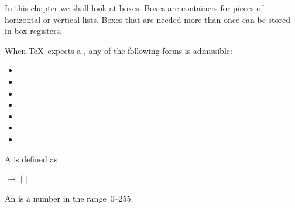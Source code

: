 \documentclass{book}
\begin{document}
In this chapter we shall look at boxes. Boxes are containers
for pieces of horizontal or vertical lists.
Boxes that are needed more than once can be stored in box registers.

When \TeX\ expects a , any of the following forms
is admissible:
\begin{itemize}
\item {}\lb{}\rb
\item {}\lb{}\rb
\item {}\lb{}\rb
\item {}
\item {}
\item {}
\item {}
\end{itemize}
A  is defined as\label{box:spec}
\begin{disp} $\longrightarrow$ 
\nl\indent$|$  
          $|$  
\end{disp}
An  is a number in the range~0--255.
\end{document}
